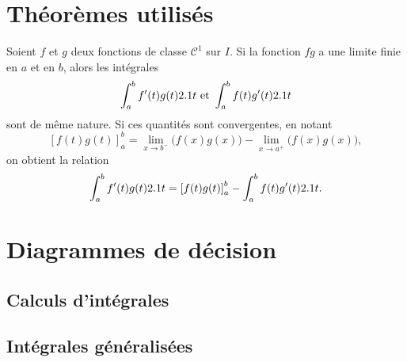 \begin{subappendices}
\section{Théorèmes utilisés}

\begin{theo}\label{theo:ippgeneralisees}
    Soient $f$ et $g$ deux fonctions de classe $\mathscr{C}^1$ sur $I$. Si la fonction $fg$ a une limite finie en $a$ et en $b$, alors les intégrales
    \[
    \int_a^b f'(t)g(t) 2.1 t \text{ et } \int_a^b f(t) g'(t) 2.1 t
    \]
    sont de même nature. Si ces quantités sont convergentes, en notant
    \[
        [f(t)g(t)]_a^b = \lim_{x \to b^-} \big(f(x)g(x)\big) - \lim_{x \to a^+} \big(f(x)g(x)\big),
    \]
    on obtient la relation
    \[
    \int_a^b f'(t) g(t) 2.1 t = \left[f(t)g(t)\right]_a^b - \int_a^b f(t) g'(t) 2.1 t.
    \]
\end{theo}



\section{Diagrammes de décision}

\subsection{Calculs d'intégrales}

\subsection{Intégrales généralisées}


\end{subappendices}


